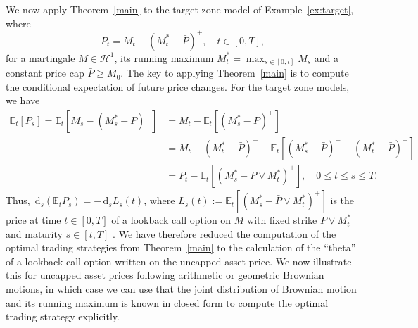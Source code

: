 \documentclass[11pt]{article}
\theoremstyle{definition}
\theoremstyle{remark}
\newtheorem{rem}[thm]{Remark}
\newcommand{\E}{\mathbb{E}} %
\newcommand{\de}{\,\mathrm{d}}
\begin{document}
We now apply Theorem~\ref{main} to the target-zone model of Example~\ref{ex:target}, where
$$
P_t=M_t -(M^*_t-\bar{P})^+, \quad t \in [0,T],
$$
for a martingale $M\in\mathcal{H}^1$, its running maximum $M^*_t=\max_{s \in [0,t]}M_s$ and a constant price cap $\bar{P} \geq M_0$. The key to applying Theorem~\ref{main} is to compute the conditional expectation of future price changes. For the target zone models, we have
\begin{align*}
\E_t[P_s] = \E_t\left[M_s-(M^*_s-\bar{P})^+\right] &= M_t-\E_t\left[(M^*_s-\bar{P})^+\right]\\
& =M_t-(M^*_t-\bar{P})^+ - \E_t\left[(M^*_s-\bar{P})^+ - (M^*_t-\bar{P})^+\right]\\
&=P_t - \E_t\left[(M^*_s-\bar{P}\vee M^*_t)^+\right], \quad 0 \leq t \leq s \leq T.
\end{align*}
Thus, $\de_s(\E_t P_s) = -\de_s L_s(t)$, where $L_s(t):=\E_t[(M^*_s-\bar{P}\vee M^*_t)^+]$ is the price at time $t \in [0,T]$ of a lookback call option on $M$ with fixed strike $\bar{P}\vee M^*_t$ and maturity $s \in [t,T]$ . We have therefore reduced the computation of the optimal trading strategies from Theorem~\ref{main} to the calculation of the ``theta'' of a lookback call option written on the uncapped asset price. We now illustrate this for uncapped asset prices following arithmetic or geometric Brownian motions, in which case we can use that the joint distribution of Brownian motion and its running maximum is known in closed form to compute the optimal trading strategy explicitly.

\end{document}
